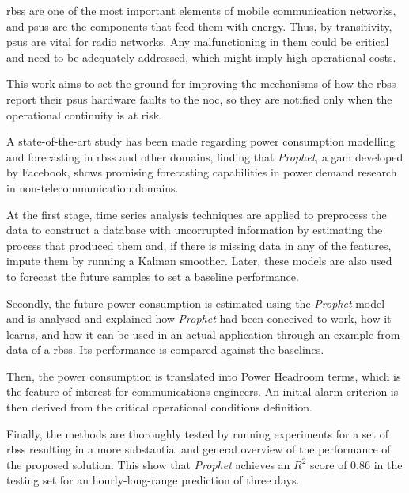 \acp{rbs} are one of the most important elements of mobile communication networks, and \acp{psu} are the components that feed them with energy. Thus, by transitivity, \acp{psu} are vital for radio networks. Any malfunctioning in them could be critical and need to be adequately addressed, which might imply high operational costs. 

This work aims to set the ground for improving the mechanisms of how the \acp{rbs} report their \acp{psu} hardware faults to the \ac{noc}, so they are notified only when the operational continuity is at risk.

A state-of-the-art study has been made regarding power consumption modelling and forecasting in \acp{rbs} and other domains, finding that \emph{Prophet}, a \ac{gam} developed by Facebook, shows promising forecasting capabilities in power demand research in non-telecommunication domains.

At the first stage, time series analysis techniques are applied to preprocess the data to construct a database with uncorrupted information by estimating the process that produced them and, if there is missing data in any of the features, impute them by running a Kalman smoother.  Later, these models are also used to forecast the future samples to set a baseline performance. 

Secondly, the future power consumption is estimated using the \emph{Prophet} model and is analysed and explained how \emph{Prophet} had been conceived to work, how it learns, and how it can be used in an actual application through an example from data of a \acp{rbs}. Its performance is compared against the baselines.

Then, the power consumption is translated into Power Headroom terms, which is the feature of interest for communications engineers. An initial alarm criterion is then derived from the critical operational conditions definition. 

Finally, the methods are thoroughly tested by running experiments for a set of \acp{rbs} resulting in a more substantial and general overview of the performance of the proposed solution. This show that \emph{Prophet} achieves an $R^2$ score of 0.86 in the testing set for an hourly-long-range prediction of three days.


